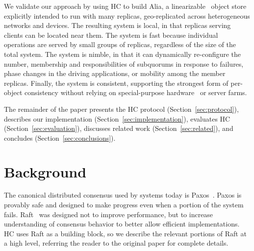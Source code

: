 \documentclass[letterpaper,10pt,twocolumn]{article}
\newcommand{\subs}{subquorums\xspace}
\newcommand{\sys}{Alia\xspace}
\begin{document}
We validate our approach by using HC to build \sys, a
linearizable~\cite{linearizability,attiya_sequential_1994} object
store explicitly intended to run with many replicas, 
geo-replicated across heterogeneous networks and devices.
The resulting system is local, in that replicas serving clients can be
located near them.
The system is fast because individual operations are served by small
groups of replicas, regardless of the size of the total system.
The system is nimble, in that it can dynamically re-configure the
number, membership and responsibilities of \subs in response to
failures, phase changes in the driving applications, or mobility among
the member replicas.
Finally, the system is consistent, supporting the strongest form of
per-object consistency without relying on special-purpose
hardware~\cite{fawn,corfu,tango,spanner,vcorfu} or server farms.



The remainder of the paper presents the HC protocol (Section~\ref{sec:protocol}),
describes our implementation (Section~\ref{sec:implementation}), evaluates HC
(Section~\ref{sec:evaluation}), discusses related work (Section~\ref{sec:related}), and
concludes (Section~\ref{sec:conclusions}).

\section{Background}
\label{sec:background}

The canonical distributed consensus used by systems today is
Paxos~\cite{paxos,lamport_paxos_2001}.
Paxos is provably safe and designed to make progress even when a portion of
the system fails.
Raft~\cite{raft} was designed not to improve performance, but to increase
understanding of consensus behavior to better allow efficient implementations.
HC uses Raft as a building block, so we describe the relevant portions of Raft
at a high level, referring the reader to the original paper for complete details.
\end{document}
